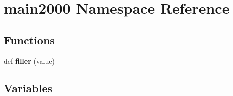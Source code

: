 \hypertarget{namespacemain2000}{}\section{main2000 Namespace Reference}
\label{namespacemain2000}
\subsection*{Functions}
\begin{DoxyCompactItemize}
\item 
def {\bfseries filler} (value)\hypertarget{namespacemain2000_a9d10cfb1d669a2c091ce75676a9006ac}{}\label{namespacemain2000_a9d10cfb1d669a2c091ce75676a9006ac}

\end{DoxyCompactItemize}
\subsection*{Variables}
